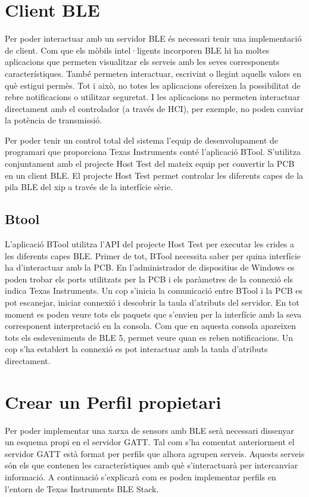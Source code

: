 \section{Client BLE}
Per poder interactuar amb un servidor BLE és necessari tenir una implementació de client.
Com que els mòbils intel·ligents incorporen BLE hi ha moltes aplicacions que permeten visualitzar els serveis amb les seves corresponents característiques.
També permeten interactuar, escrivint o llegint aquells valors en què estigui permès.
Tot i això, no totes les aplicacions ofereixen la possibilitat de rebre notificacions o utilitzar seguretat.
I les aplicacions no permeten interactuar directament amb el controlador (a través de HCI), per exemple, no poden canviar la potència de transmissió. 

Per poder tenir un control total del sistema l'equip de desenvolupament de programari que proporciona Texas Instruments conté l'aplicació BTool.
S'utilitza conjuntament amb el projecte Host Test del mateix equip per convertir la PCB en un client BLE.
El projecte Host Test permet controlar les diferents capes de la pila BLE del xip a través de la interfície sèrie.

\subsection{Btool}
L'aplicació BTool utilitza l'API del projecte Host Test per executar les crides a les diferents capes BLE.
Primer de tot, BTool necessita saber per quina interfície ha d'interactuar amb la PCB.
En l'administrador de dispositius de Windows es poden trobar els ports utilitzats per la PCB i els paràmetres de la connexió els indica Texas Instruments\cite{serial_params}.
Un cop s'inicia la comunicació entre BTool i la PCB es pot escanejar, iniciar connexió i descobrir la taula d'atributs del servidor.
En tot moment es poden veure tots els paquets que s'envien per la interfície amb la seva corresponent interpretació en la consola.
Com que en aquesta consola apareixen tots els esdeveniments de BLE 5, permet veure quan es reben notificacions.
Un cop s'ha establert la connexió es pot interactuar amb la taula d'atributs directament.


\section{Crear un Perfil propietari}
Per poder implementar una xarxa de sensors amb BLE serà necessari dissenyar un esquema propi en el servidor GATT.
Tal com s'ha comentat anteriorment el servidor GATT està format per perfils que alhora agrupen serveis.
Aquests serveis són els que contenen les característiques amb què s'interactuarà per intercanviar informació.
A continuació s'explicarà com es poden implementar perfils en l'entorn de Texas Instruments BLE Stack.

